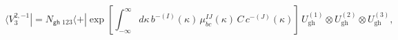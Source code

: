 \begin{equation}
\langle V_3^{2,-1}|=N_{\textsf{gh}}\,{}_{123}\langle +|
\exp\left[
\int_{-\infty}^{\infty}d\kappa\,
b^{-(I)}(\kappa)\,\mu_{bc}^{IJ}(\kappa)\,C\,c^{-(J)}(\kappa)
\right]\,U_{\text{gh}}^{(1)}\otimes U_{\text{gh}}^{(2)}\otimes
U_{\text{gh}}^{(3)},
\label{Vgh3}
\end{equation}

